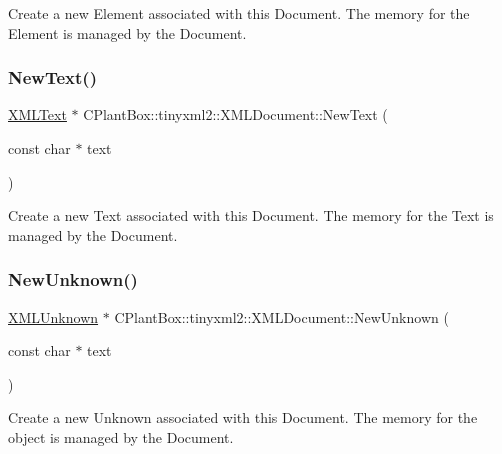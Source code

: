 Create a new Element associated with this Document. The memory for the Element is managed by the Document. \mbox{\label{classCPlantBox_1_1tinyxml2_1_1XMLDocument_a08aab2b2f1d62fd2597bb42d9b9762b2}} 
\subsubsection{\texorpdfstring{New\+Text()}{NewText()}}
{\footnotesize\ttfamily \hyperlink{classCPlantBox_1_1tinyxml2_1_1XMLText}{X\+M\+L\+Text} $\ast$ C\+Plant\+Box\+::tinyxml2\+::\+X\+M\+L\+Document\+::\+New\+Text (\begin{DoxyParamCaption}\item[{const char $\ast$}]{text }\end{DoxyParamCaption})}

Create a new Text associated with this Document. The memory for the Text is managed by the Document. \mbox{\label{classCPlantBox_1_1tinyxml2_1_1XMLDocument_af584970bff0c37f37934ba804bfd7889}} 
\subsubsection{\texorpdfstring{New\+Unknown()}{NewUnknown()}}
{\footnotesize\ttfamily \hyperlink{classCPlantBox_1_1tinyxml2_1_1XMLUnknown}{X\+M\+L\+Unknown} $\ast$ C\+Plant\+Box\+::tinyxml2\+::\+X\+M\+L\+Document\+::\+New\+Unknown (\begin{DoxyParamCaption}\item[{const char $\ast$}]{text }\end{DoxyParamCaption})}

Create a new Unknown associated with this Document. The memory for the object is managed by the Document. \mbox{\label{classCPlantBox_1_1tinyxml2_1_1XMLDocument_a471df8c13bad00822e3d57d4d60176ad}} 

